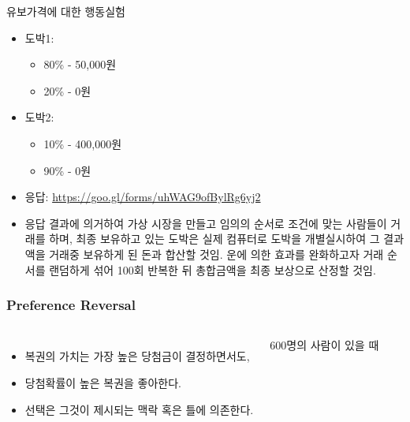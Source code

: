 \documentclass[final]{beamer}
\begin{document}
\begin{frame}[t]{유보가격에 대한 행동실험}
	\begin{itemize}
		\item 도박1: 
		\begin{itemize}
			\item 80\% - 50,000원
			\item 20\% - 0원
		\end{itemize}
		\item 도박2:
		\begin{itemize}
			\item 10\% - 400,000원
			\item 90\% - 0원
		\end{itemize}
		\item 응답: \url{https://goo.gl/forms/uhWAG9ofBylRg6yj2}
		\item ​응답 결과에 의거하여 가상 시장을 만들고 임의의 순서로 조건에 맞는 사람들이 거래를 하며, 최종 보유하고 있는 도박은 실제 컴퓨터로 도박을 개별실시하여 그 결과액을 거래중 보유하게 된 돈과 합산할 것임. 운에 의한 효과를 완화하고자 거래 순서를 랜덤하게 섞어 100회 반복한 뒤 총합금액을 최종 보상으로 산정할 것임. 
	\end{itemize}
\end{frame}

%
\begin{frame}\frametitle{Preference Reversal}\vspace{3em}
%
\begin{columns}[c]
\column{12em}
\begin{itemize}
\item 복권의 가치는 가장 높은 당첨금이 결정하면서도, 
\item 당첨확률이 높은 복권을 좋아한다. 
\item 선택은 그것이 제시되는 맥락 혹은 틀에 의존한다. 
\end{itemize}
\column{18em}
600명의 사람이 있을 때 \\[1em]
\\[1em]
\end{columns}
\end{frame}
%
\end{document}
